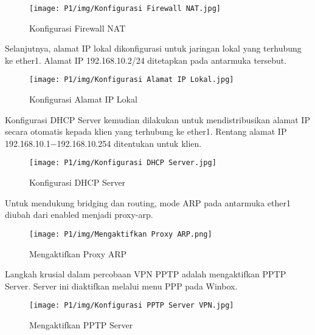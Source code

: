 \begin{figure}[H]
\centering
\begin{minipage}[b]{0.45\textwidth}
\texttt{[image: P1/img/Konfigurasi Firewall NAT.jpg]}
\caption{Konfigurasi Firewall NAT}
\label{fig:firewall_nat}
\end{minipage}
\end{figure}

Selanjutnya, alamat IP lokal dikonfigurasi untuk jaringan lokal yang terhubung ke ether1. Alamat IP 192.168.10.2/24 ditetapkan pada antarmuka tersebut.

\begin{figure}[H]
\centering
\begin{minipage}[b]{0.45\textwidth}
\texttt{[image: P1/img/Konfigurasi Alamat IP Lokal.jpg]}
\caption{Konfigurasi Alamat IP Lokal}
\label{fig:ip_lokal}
\end{minipage}
\end{figure}

Konfigurasi DHCP Server kemudian dilakukan untuk mendistribusikan alamat IP secara otomatis kepada klien yang terhubung ke ether1. Rentang alamat IP 192.168.10.1−192.168.10.254 ditentukan untuk klien.

\begin{figure}[H]
\centering
\begin{minipage}[b]{0.45\textwidth}
\texttt{[image: P1/img/Konfigurasi DHCP Server.jpg]}
\caption{Konfigurasi DHCP Server}
\label{fig:dhcp_server}
\end{minipage}
\end{figure}

Untuk mendukung bridging dan routing, mode ARP pada antarmuka ether1 diubah dari enabled menjadi proxy-arp.

\begin{figure}[H]
\centering
\begin{minipage}[b]{0.45\textwidth}
\texttt{[image: P1/img/Mengaktifkan Proxy ARP.png]}
\caption{Mengaktifkan Proxy ARP}
\label{fig:proxy_arp}
\end{minipage}
\end{figure}

Langkah krusial dalam percobaan VPN PPTP adalah mengaktifkan PPTP Server. Server ini diaktifkan melalui menu PPP pada Winbox.

\begin{figure}[H]
\centering
\begin{minipage}[b]{0.45\textwidth}
\texttt{[image: P1/img/Konfigurasi PPTP Server VPN.jpg]}
\caption{Mengaktifkan PPTP Server}
\label{fig:pptp_server}
\end{minipage}
\end{figure}

